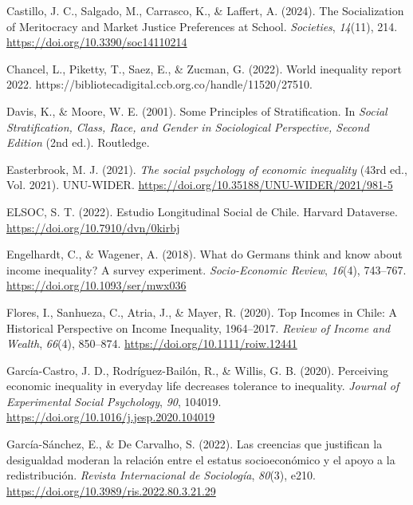 \documentclass[
  12pt,
]{article}
\newlength{\cslhangindent}
\newenvironment{CSLReferences}[2] %
 {\begin{list}{}{%
  \setlength{\itemindent}{0pt}
  \setlength{\leftmargin}{0pt}
  \setlength{\parsep}{0pt}
  \ifodd #1
   \setlength{\leftmargin}{\cslhangindent}
   \setlength{\itemindent}{-1\cslhangindent}
  \fi
  \setlength{\itemsep}{#2\baselineskip}}}
 {\end{list}}
\begin{document}
\begin{CSLReferences}{1}{0}
Castillo, J. C., Salgado, M., Carrasco, K., \& Laffert, A. (2024). The
{Socialization} of {Meritocracy} and {Market Justice Preferences} at
{School}. \emph{Societies}, \emph{14}(11), 214.
\url{https://doi.org/10.3390/soc14110214}

Chancel, L., Piketty, T., Saez, E., \& Zucman, G. (2022). World
inequality report 2022.
https://bibliotecadigital.ccb.org.co/handle/11520/27510.

Davis, K., \& Moore, W. E. (2001). Some {Principles} of
{Stratification}. In \emph{Social {Stratification}, {Class}, {Race}, and
{Gender} in {Sociological Perspective}, {Second Edition}} (2nd ed.).
Routledge.

Easterbrook, M. J. (2021). \emph{The social psychology of economic
inequality} (43rd ed., Vol. 2021). UNU-WIDER.
\url{https://doi.org/10.35188/UNU-WIDER/2021/981-5}

ELSOC, S. T. (2022). Estudio {Longitudinal Social} de {Chile}. Harvard
Dataverse. \url{https://doi.org/10.7910/dvn/0kirbj}

Engelhardt, C., \& Wagener, A. (2018). What do {Germans} think and know
about income inequality? {A} survey experiment. \emph{Socio-Economic
Review}, \emph{16}(4), 743--767.
\url{https://doi.org/10.1093/ser/mwx036}

Flores, I., Sanhueza, C., Atria, J., \& Mayer, R. (2020). Top {Incomes}
in {Chile}: {A Historical Perspective} on {Income Inequality},
1964--2017. \emph{Review of Income and Wealth}, \emph{66}(4), 850--874.
\url{https://doi.org/10.1111/roiw.12441}

García-Castro, J. D., Rodríguez-Bailón, R., \& Willis, G. B. (2020).
Perceiving economic inequality in everyday life decreases tolerance to
inequality. \emph{Journal of Experimental Social Psychology}, \emph{90},
104019. \url{https://doi.org/10.1016/j.jesp.2020.104019}

García-Sánchez, E., \& De Carvalho, S. (2022). Las creencias que
justifican la desigualdad moderan la relaci{ó}n entre el estatus
socioecon{ó}mico y el apoyo a la redistribuci{ó}n. \emph{Revista
Internacional de Sociolog{í}a}, \emph{80}(3), e210.
\url{https://doi.org/10.3989/ris.2022.80.3.21.29}


\end{CSLReferences}
\end{document}
